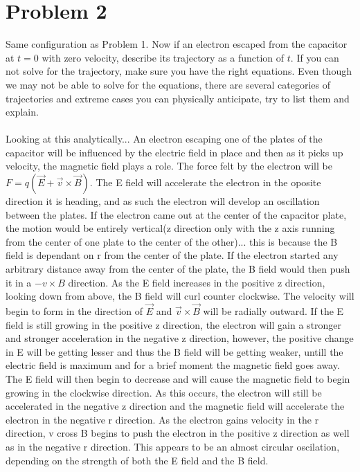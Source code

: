 \documentclass[a4paper,12pt]{article}
\newcommand{\V}[1]{\ensuremath{\vec{#1}}}
\newcommand{\Q}[1]{\newpage \section*{#1}}
\begin{document}
\Q{Problem 2}
Same configuration as Problem 1.  Now if an electron escaped from the capacitor at $t=0$ with zero velocity, describe its trajectory as a function of $t$. If you can not solve for the trajectory, make sure you have the right equations. Even though we may not be able to solve for the equations, there are several categories of trajectories and extreme cases you can physically anticipate, try to list them and explain.
\\
\\
Looking at this analytically...  An electron escaping one of the plates of the capacitor will be influenced by the electric field in place and then as it picks up velocity, the magnetic field plays a role.  The force felt by the electron will be $F=q(\V{E}+\V{v}\times\V{B})$.  The E field will accelerate the electron in the oposite direction it is heading, and as such the electron will develop an oscillation between the plates.  If the electron came out at the center of the capacitor plate, the motion would be entirely vertical(z direction only with the z axis running from the center of one plate to the center of the other)... this is because the B field is dependant on r from the center of the plate. If the electron started any arbitrary distance away from the center of the plate, the B field would then push it in a $-v\times B$ direction.  As the E field increases in the positive z direction, looking down from above, the B field will curl counter clockwise.  The velocity will begin to form in the direction of $\V{E}$ and $\V{v}\times\V{B}$ will be radially outward. If the E field is still growing in the positive z direction, the electron will gain a stronger and stronger acceleration in the negative z direction, however, the positive change in E will be getting lesser and thus the B field will be getting weaker, untill the electric field is maximum and for a brief moment the magnetic field goes away.  The E field will then begin to decrease and will cause the magnetic field to begin growing in the clockwise direction.  As this occurs, the electron will still be accelerated in the negative z direction and the magnetic field will accelerate the electron in the negative r direction.  As the electron gains velocity in the r direction, v cross B begins to push the electron in the positive z direction as well as in the negative r direction.  This appears to be an almost circular oscilation, depending on the strength of both the E field and the B field.
\\
\\
\end{document}
